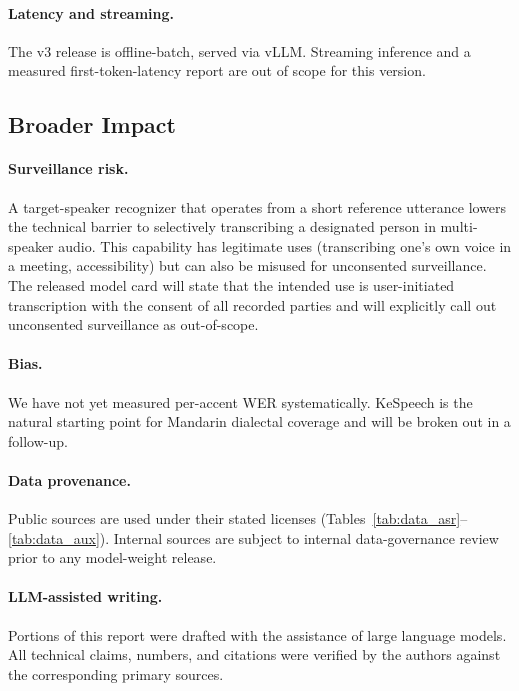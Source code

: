 \paragraph{Latency and streaming.}
The v3 release is offline-batch, served via vLLM. Streaming inference
and a measured first-token-latency report are out of scope for this
version.

\subsection{Broader Impact}

\paragraph{Surveillance risk.}
A target-speaker recognizer that operates from a short reference
utterance lowers the technical barrier to selectively transcribing a
designated person in multi-speaker audio. This capability has
legitimate uses (transcribing one's own voice in a meeting,
accessibility) but can also be misused for unconsented surveillance.
The released model card will state that the intended use is
user-initiated transcription with the consent of all recorded parties
and will explicitly call out unconsented surveillance as out-of-scope.

\paragraph{Bias.}
We have not yet measured per-accent WER systematically. KeSpeech is the
natural starting point for Mandarin dialectal coverage and will be
broken out in a follow-up.

\paragraph{Data provenance.}
Public sources are used under their stated licenses (Tables~\ref{tab:data_asr}--\ref{tab:data_aux}).
Internal sources are subject to internal data-governance review prior
to any model-weight release.

\paragraph{LLM-assisted writing.}
Portions of this report were drafted with the assistance of large
language models. All technical claims, numbers, and citations were
verified by the authors against the corresponding primary sources.
